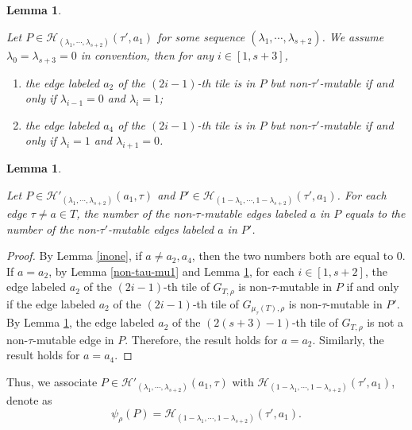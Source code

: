 \documentclass[10pt]{amsart}
\theoremstyle{theorems}
\newtheorem{Lemma}[Theorem]{Lemma}
\begin{document}
\begin{Lemma}\label{non-tau-mu2}

Let $P\in \mathcal H_{(\lambda_1,\cdots,\lambda_{s+2})}(\tau',a_1)$ for some sequence $(\lambda_1,\cdots,\lambda_{s+2})$. We assume $\lambda_{0}=\lambda_{s+3}=0$ in convention, then for any $i\in [1,s+3]$,

 \begin{enumerate}[$(1)$]

   \item the edge labeled $a_2$ of the $(2i-1)$-th tile is in $P$ but non-$\tau'$-mutable if and only if $\lambda_{i-1}=0$ and $\lambda_i=1$;

   \item the edge labeled $a_4$ of the $(2i-1)$-th tile is in $P$ but non-$\tau'$-mutable if and only if $\lambda_{i}=1$ and $\lambda_{i+1}=0$.

 \end{enumerate}


\end{Lemma}

\medskip

\begin{Lemma}\label{same-num}

Let $P\in \mathcal H'_{(\lambda_1,\cdots,\lambda_{s+2})}(a_1,\tau)$ and $P'\in\mathcal H_{(1-\lambda_1,\cdots,1-\lambda_{s+2})}(\tau',a_1)$. For each edge $\tau \neq a\in T$, the number of the non-$\tau$-mutable edges labeled $a$ in $P$ equals to the number of the non-$\tau'$-mutable edges labeled $a$ in $P'$.

\end{Lemma}

\begin{proof}

By Lemma \ref{inone}, if $a\neq a_2,a_4$, then the two numbers both are equal to $0$. If $a=a_2$, by Lemma \ref{non-tau-mu1} and Lemma \ref{non-tau-mu2}, for each $i\in [1,s+2]$, the edge labeled $a_2$ of the $(2i-1)$-th tile of $G_{T,\rho}$ is non-$\tau$-mutable in $P$ if and only if the edge labeled $a_2$ of the $(2i-1)$-th tile of $G_{\mu_{\tau}(T),\rho}$ is non-$\tau$-mutable in $P'$. By Lemma \ref{non-tau-mu2}, the edge labeled $a_2$ of the $(2(s+3)-1)$-th tile of $G_{T,\rho}$ is not a non-$\tau$-mutable edge in $P$. Therefore, the result holds for $a=a_2$. Similarly, the result holds for $a=a_4$.
\end{proof}

\medskip

Thus, we associate $P\in \mathcal H'_{(\lambda_1,\cdots,\lambda_{s+2})}(a_1,\tau)$ with $\mathcal H_{(1-\lambda_1,\cdots,1-\lambda_{s+2})}(\tau',a_1)$, denote as
$$\psi_{\rho}(P)=\mathcal H_{(1-\lambda_1,\cdots,1-\lambda_{s+2})}(\tau',a_1).$$
\end{document}
